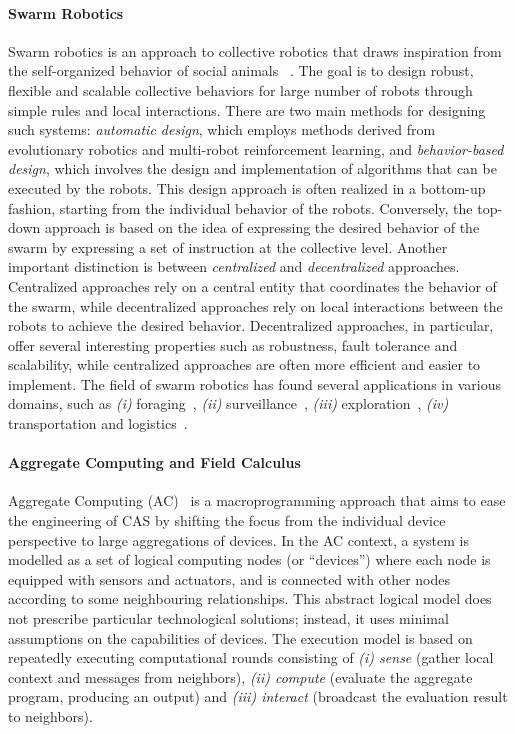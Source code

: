 \documentclass[12pt]{article}
\begin{document}
\paragraph{\textbf{Swarm Robotics}} Swarm robotics is an approach to collective robotics that draws inspiration from the self-organized behavior of social animals ~\cite{brambilla2013swarm}. The goal is to design robust, flexible and scalable 
collective behaviors for large number of robots through simple rules and local interactions. There are two main methods for designing such systems: \textit{automatic design}, which employs methods derived from
evolutionary robotics and multi-robot reinforcement learning, and \textit{behavior-based design}, which involves the design and implementation of algorithms that can be executed by the robots. This design approach is often realized
in a bottom-up fashion, starting from the individual behavior of the robots. Conversely, the top-down approach is based on the idea of expressing the desired behavior of the swarm by expressing a set of instruction at the collective level.
Another important distinction is between \textit{centralized} and \textit{decentralized} approaches. Centralized approaches rely on a central entity that coordinates the behavior of the swarm, while decentralized approaches rely on local interactions between the robots to achieve the desired behavior.
Decentralized approaches, in particular, offer several interesting properties such as robustness, fault tolerance and scalability, while centralized approaches are often more efficient and easier to implement.
The field of swarm robotics has found several applications in various domains, such as \textit{(i)} foraging~\cite{talamali2020sophisticated}, \textit{(ii)} surveillance~\cite{saska2016swarm}, \textit{(iii)} exploration~\cite{huang2019exploration}, \textit{(iv)} transportation and logistics~\cite{zhang2015swarm}.

\paragraph{\textbf{Aggregate Computing and Field Calculus}} Aggregate Computing (AC)~\cite{beal2016aggregate} is a macroprogramming approach that aims to ease the engineering of CAS by shifting the
focus from the individual device perspective to large aggregations of devices.
In the AC context, a system  is modelled as a set of logical computing nodes (or ``devices'')
where each node is equipped with sensors and actuators, and is connected with other nodes
according to some neighbouring relationships. This abstract logical model does not prescribe
particular technological solutions; instead, it uses minimal assumptions on the capabilities
of devices. The execution model is based on repeatedly executing computational rounds consisting of
\textit{(i) sense} (gather local context and messages from neighbors), \textit{(ii) compute} (evaluate the aggregate program, producing an output) and 
\textit{(iii) interact} (broadcast the evaluation result to neighbors).
\end{document}
